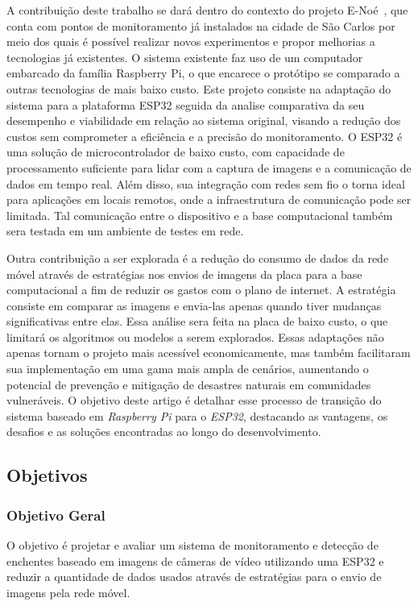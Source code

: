 \documentclass[12pt]{article}
\begin{document}
\begin{spacing}{1}
A contribuição deste trabalho se dará dentro do contexto do projeto E-Noé~\cite{ranieri2024deep}, que conta com pontos de monitoramento já instalados na cidade de São Carlos por meio dos quais é possível realizar novos experimentos e propor melhorias a tecnologias já existentes. O sistema existente faz uso de um computador embarcado da família Raspberry Pi, o que encarece o protótipo se comparado a outras tecnologias de mais baixo custo. Este projeto consiste na adaptação do sistema para a plataforma ESP32 seguida da analise comparativa da seu desempenho e viabilidade em relação ao sistema original, visando a redução dos custos sem comprometer a eficiência e a precisão do monitoramento. O ESP32 é uma solução de microcontrolador de baixo custo, com capacidade de processamento suficiente para lidar com a captura de imagens e a comunicação de dados em tempo real. Além disso, sua integração com redes sem fio o torna ideal para aplicações em locais remotos, onde a infraestrutura de comunicação pode ser limitada. Tal comunicação entre o dispositivo e a base computacional também sera testada em um ambiente de testes em rede.

Outra contribuição a ser explorada é a redução do consumo de dados da rede móvel através de estratégias nos envios de imagens da placa para a base computacional a fim de reduzir os gastos com o plano de internet. A estratégia consiste em comparar as imagens e envia-las apenas quando tiver mudanças significativas entre elas. Essa análise sera feita na placa de baixo custo, o que limitará os algoritmos ou modelos a serem explorados. Essas adaptações não apenas tornam o projeto mais acessível economicamente, mas também facilitaram sua implementação em uma gama mais ampla de cenários, aumentando o potencial de prevenção e mitigação de desastres naturais em comunidades vulneráveis. O objetivo deste artigo é detalhar esse processo de transição do sistema baseado em \textit{Raspberry Pi} para o \textit{ESP32}, destacando as vantagens, os desafios e as soluções encontradas ao longo do desenvolvimento.

\subsection{Objetivos} 

\subsubsection{Objetivo Geral}
O objetivo é projetar e avaliar um sistema de monitoramento e detecção de enchentes baseado em imagens de câmeras de vídeo utilizando uma ESP32 e reduzir a quantidade de dados usados através de estratégias para o envio de imagens pela rede móvel.


\end{spacing}
\end{document}
